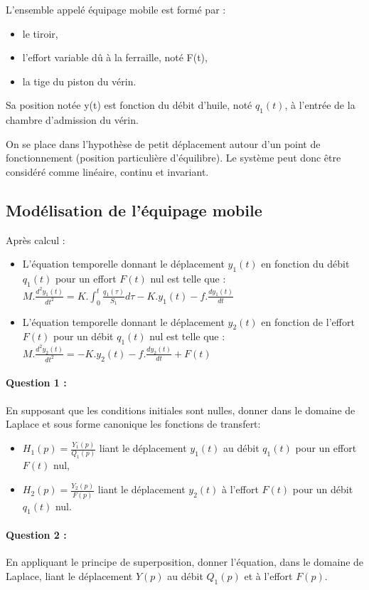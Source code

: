 L'ensemble appelé \og équipage mobile \fg est formé par :
\begin{itemize}
 \item le tiroir,
 \item l'effort variable dû à la ferraille, noté F(t),
 \item la tige du piston du vérin.
\end{itemize}

Sa position notée y(t) est fonction du débit d'huile, noté $q_1(t)$, à l'entrée de la chambre d'admission du vérin.

On se place dans l'hypothèse de petit déplacement autour d'un point de fonctionnement (position particulière d'équilibre). Le système peut donc être considéré comme linéaire, continu et invariant.

\subsection{Modélisation de l'équipage mobile}

Après calcul :
\begin{itemize}
 \item L'équation temporelle donnant le déplacement $y_1(t)$ en fonction du débit $q_1(t)$ pour un effort $F(t)$ nul est telle que : 
 $M.\frac{d^2y_1(t)}{dt^2}=K.\int_{0}^{t} \frac{q_1(\tau)}{S_1}d\tau-K.y_1(t)-f.\frac{dy_1(t)}{dt}$
 \item L'équation temporelle donnant le déplacement $y_2(t)$ en fonction de l'effort $F(t)$ pour un débit $q_1(t)$ nul est telle que :
 $M.\frac{d^2y_2(t)}{dt^2}=-K.y_2(t)-f.\frac{dy_2(t)}{dt}+F(t)$
\end{itemize}

\paragraph{Question 1 :} En supposant que les conditions initiales sont nulles, donner dans le domaine de Laplace et sous forme canonique les fonctions de transfert:

\begin{itemize}
 \item $H_1(p)=\frac{Y_1(p)}{Q_1(p)}$ liant le déplacement $y_1(t)$ au débit $q_1(t)$ pour un effort $F(t)$ nul,
 \item $H_2(p)=\frac{Y_2(p)}{F(p)}$ liant le déplacement $y_2(t)$ à l'effort $F(t)$ pour un débit $q_1(t)$ nul.
\end{itemize}
  
\paragraph{Question 2 :} En appliquant le principe de superposition, donner l'équation, dans le domaine de Laplace, liant le déplacement $Y(p)$ au débit $Q_1(p)$ et à l'effort $F(p)$.

